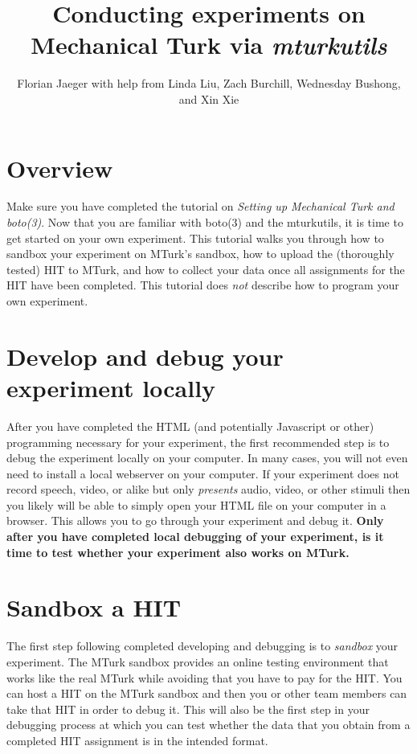 \documentclass{article}
\title{Conducting experiments on Mechanical Turk via {\em mturkutils}}
\author{Florian Jaeger with help from Linda Liu, Zach Burchill, Wednesday Bushong, and Xin Xie}
\begin{document}
\maketitle

\tableofcontents

\section{Overview}

Make sure you have completed the tutorial on {\em Setting up Mechanical Turk and boto(3)}. Now that you are familiar with boto(3) and the mturkutils, it is time to get started on your own experiment. This tutorial walks you through how to sandbox your experiment on MTurk's sandbox, how to upload the (thoroughly tested) HIT to MTurk, and how to collect your data once all assignments for the HIT have been completed. This tutorial does {\em not} describe how to program your own experiment.


\section{Develop and debug your experiment locally}

After you have completed the HTML (and potentially Javascript or other) programming necessary for your experiment, the first recommended step is to debug the experiment locally on your computer. In many cases, you will not even need to install a local webserver on your computer. If your experiment does not record speech, video, or alike but only {\em presents} audio, video, or other stimuli then you likely will be able to simply open your HTML file on your computer in a browser. This allows you to go through your experiment and debug it. \textbf{Only after you have completed local debugging of your experiment, is it time to test whether your experiment also works on MTurk.}



\section{Sandbox a HIT}

The first step following completed developing and debugging is to {\em sandbox} your experiment. The MTurk sandbox provides an online testing environment that works like the real MTurk while avoiding that you have to pay for the HIT. You can host a HIT on the MTurk sandbox and then you or other team members can take that HIT in order to debug it. This will also be the first step in your debugging process at which you can test whether the data that you obtain from a completed HIT assignment is in the intended format.
\end{document}
